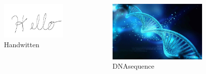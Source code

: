 \documentclass{beamer}
\begin{document}
\begin{frame}
\begin{columns}
\begin{column}{.3\textwidth}
\begin{figure}
\includegraphics[width=\textwidth]{hand.jpg}
\caption {Handwitten}
\end{figure}
\end{column}
\begin{column}{.3\textwidth}
\begin{figure}
\includegraphics[width=\textwidth]{dna.jpg}
\caption {DNAsequence}
\end{figure}
\end{column}
\begin{column}{.3\textwidth}
\end{column}
\end{columns}


\end{frame}
\end{document}
